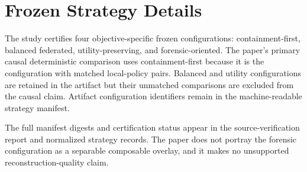 \section{Frozen Strategy Details}

The study certifies four objective-specific frozen configurations: containment-first, balanced federated, utility-preserving, and forensic-oriented. The paper's primary causal deterministic comparison uses containment-first because it is the configuration with matched local-policy pairs. Balanced and utility configurations are retained in the artifact but their unmatched comparisons are excluded from the causal claim. Artifact configuration identifiers remain in the machine-readable strategy manifest.

The full manifest digests and certification status appear in the source-verification report and normalized strategy records. The paper does not portray the forensic configuration as a separable composable overlay, and it makes no unsupported reconstruction-quality claim.
